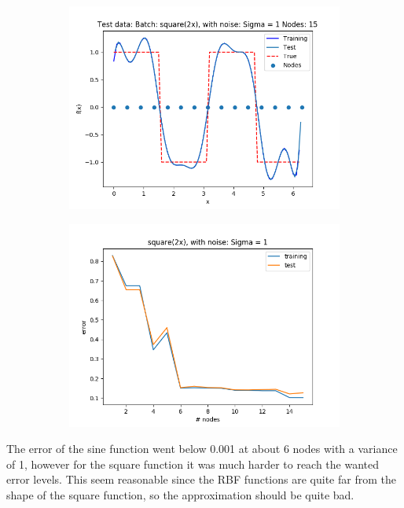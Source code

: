 \documentclass{article}
\begin{document}
\begin{figure}[ht!]
\begin{subfigure}[t]{0.4\textwidth}
        \includegraphics[width=1\textwidth]{plots/batch/best_square2x.png}
        \caption{}
    \end{subfigure}
    \begin{subfigure}[t]{0.4\textwidth}
        \centering
        \includegraphics[width=1\textwidth]{plots/batch/best_square2x_error.png}
        \caption{}
    \end{subfigure}
\end{figure}

The error of the sine function went below 0.001 at about 6 nodes with a variance of 1, however for the square function it was much harder to reach the wanted error levels. This seem reasonable since the RBF functions are quite far from the shape of the square function, so the approximation should be quite bad.
\end{document}
